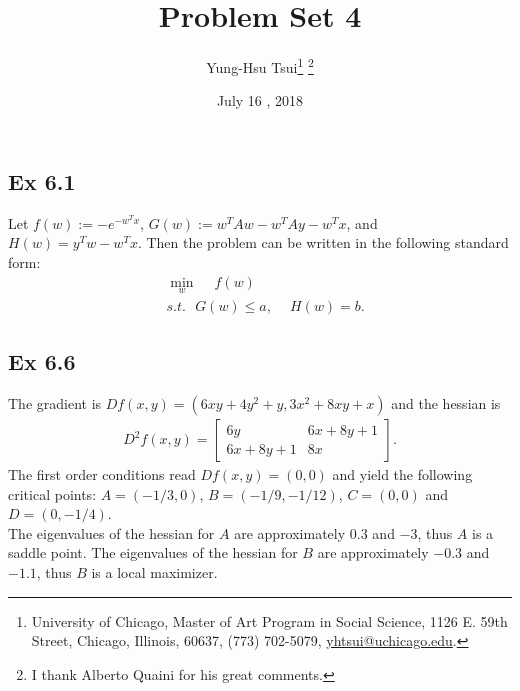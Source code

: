 \documentclass[letterpaper,12pt]{article}
\theoremstyle{definition}
\begin{document}
	
	\title{Problem Set 4\\
	}
	\author{
		Yung-Hsu Tsui\footnote{University of Chicago, Master of Art Program in Social Science, 1126 E. 59th Street, Chicago, Illinois, 60637, (773) 702-5079, \href{mailto:}{yhtsui@uchicago.edu}.} \footnote{I thank Alberto Quaini for his great comments.}\\[-2pt]
	}
	\date{July 16 ,  2018 }
	\vspace{-9mm}
	\maketitle
	\thispagestyle{empty}
	
	\pagestyle{fancy}
	\fancyhf{}
	\cfoot{\thepage}
	
	\begin{spacing}{1.3}{}
		\vspace{1 mm}

	
	\subsection*{Ex 6.1}
	Let $f(w):=-e^{-w^Tx}$, $G(w):=w^TAw - w^TAy - w^Tx$,
	and $H(w)=y^Tw-w^Tx$. 
	Then the problem can be written in the following standard form:
	\begin{align*}
	&\min_{w} \quad\ f(w)\\
	&s.t. \text{     }G(w)\leq a, \quad\ H(w)=b.
	\end{align*}
	
	\subsection*{Ex 6.6}
	The gradient is $Df(x,y)=(6xy+4y^2+y, 3x^2+8xy+x)$ and the hessian is
	\begin{align*}
	D^2f(x,y) = 
	\begin{bmatrix}
	6y & 6x+8y+1\\ 6x+8y+1 & 8x
	\end{bmatrix}.
	\end{align*}
	The first order conditions read $Df(x,y)=(0,0)$ and yield the following critical points:
	$A=(-1/3,0)$, $B=(-1/9, -1/12)$, $C=(0,0)$ and $D=(0,-1/4)$.\\
	
	The eigenvalues of the hessian for $A$ are approximately $0.3$ and $-3$, thus $A$ is a saddle point. The eigenvalues of the hessian for $B$ are approximately $-0.3$ and $-1.1$, thus $B$ is a local maximizer.\\
	

\end{spacing}
\end{document}

